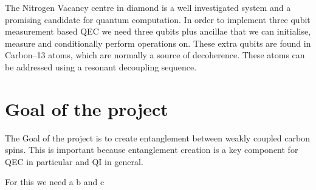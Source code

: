 




The Nitrogen Vacancy centre in diamond is a well investigated system\citep{Doherty2013NitrogenVacancy} and a promising candidate for quantum computation\citep{Childress2013Diamond}. In order to implement three qubit measurement based QEC we need three qubits plus ancillae that we can initialise, measure and conditionally perform operations on. These extra qubits are found in Carbon--13 atoms, which are normally a source of decoherence. These atoms can be addressed using a resonant decoupling sequence\citep{Taminiau2012Detectiona}.


\section{Goal of the project}
The Goal of the project is to create entanglement between weakly coupled carbon spins.
This is important because entanglement creation is a key component for QEC in particular and QI in general.

For this we need a b and c
